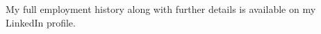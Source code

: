 \begin{justify}
My full employment history along with further details is available on my LinkedIn profile.
\end{justify}